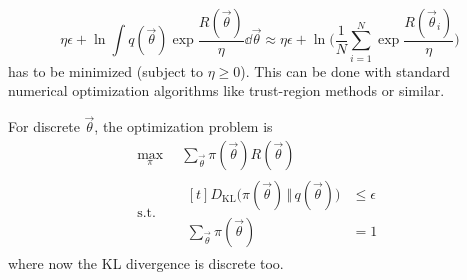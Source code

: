 			\begin{equation*}
				\eta\epsilon + \ln \int\! q(\vec{\theta}) \exp{\frac{R(\vec{\theta})}{\eta}} \dd{\vec{\theta}}
					\approx \eta\epsilon + \ln \Bigg(\! \frac{1}{N} \sum_{i = 1}^{N} \exp{\frac{R(\vec{\theta}_i)}{\eta}} \!\Bigg)
			\end{equation*}
			has to be minimized (subject to \( \eta \geq 0 \)). This can be done with standard numerical optimization algorithms like trust-region methods or similar.

			For discrete \(\vec{\theta}\), the optimization problem is
			\begin{equation}
				\begin{aligned}
					\max_\pi \,& \sum_{\vec{\theta}} \pi(\vec{\theta}) R(\vec{\theta}) \\
					\mathrm{s.t.} \quad&
						\begin{aligned}[t]
							D_\mathrm{KL}\big( \pi(\vec{\theta}) \,\Vert\, q(\vec{\theta}) \big) &\leq \epsilon \\
							\sum_{\vec{\theta}} \pi(\vec{\theta}) &= 1
						\end{aligned}
				\end{aligned}
			\end{equation}
			where now the KL divergence is discrete too.

